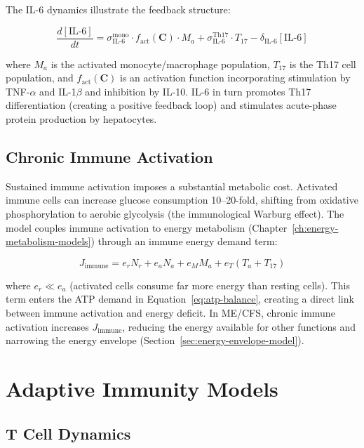 The IL-6 dynamics illustrate the feedback structure:

\begin{equation}
\label{eq:il6}
\frac{d[\text{IL-6}]}{dt} = \sigma_{\text{IL-6}}^{\text{mono}} \cdot f_{\text{act}}(\boldsymbol{C}) \cdot M_a + \sigma_{\text{IL-6}}^{\text{Th17}} \cdot T_{17} - \delta_{\text{IL-6}} [\text{IL-6}]
\end{equation}

where $M_a$ is the activated monocyte/macrophage population, $T_{17}$ is the Th17 cell population, and $f_{\text{act}}(\boldsymbol{C})$ is an activation function incorporating stimulation by TNF-$\alpha$ and IL-1$\beta$ and inhibition by IL-10. IL-6 in turn promotes Th17 differentiation (creating a positive feedback loop) and stimulates acute-phase protein production by hepatocytes.

\subsection{Chronic Immune Activation}
\label{sec:chronic-activation-model}

Sustained immune activation imposes a substantial metabolic cost. Activated immune cells can increase glucose consumption 10--20-fold, shifting from oxidative phosphorylation to aerobic glycolysis (the immunological Warburg effect). The model couples immune activation to energy metabolism (Chapter~\ref{ch:energy-metabolism-models}) through an immune energy demand term:

\begin{equation}
\label{eq:immune-energy}
J_{\text{immune}} = e_r N_r + e_a N_a + e_M M_a + e_T (T_a + T_{17})
\end{equation}

where $e_r \ll e_a$ (activated cells consume far more energy than resting cells). This term enters the ATP demand in Equation~\ref{eq:atp-balance}, creating a direct link between immune activation and energy deficit. In ME/CFS, chronic immune activation increases $J_{\text{immune}}$, reducing the energy available for other functions and narrowing the energy envelope (Section~\ref{sec:energy-envelope-model}).

\section{Adaptive Immunity Models}
\label{sec:adaptive-immunity-models}

\subsection{T Cell Dynamics}
\label{sec:tcell-model}

